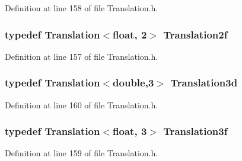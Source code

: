 Definition at line 158 of file Translation.\-h.

\hypertarget{group___geometry___module_ga94a8401d6caf6c9688fd14a17297fa20}{
\subsubsection[{Translation2f}]{\setlength{\rightskip}{0pt plus 5cm}typedef {\bf Translation}$<${\bf float}, 2$>$ {\bf Translation2f}}}\label{group___geometry___module_ga94a8401d6caf6c9688fd14a17297fa20}


Definition at line 157 of file Translation.\-h.

\hypertarget{group___geometry___module_gac7244ecac036525fb23aad8d3bf3209f}{
\subsubsection[{Translation3d}]{\setlength{\rightskip}{0pt plus 5cm}typedef {\bf Translation}$<${\bf double},3$>$ {\bf Translation3d}}}\label{group___geometry___module_gac7244ecac036525fb23aad8d3bf3209f}


Definition at line 160 of file Translation.\-h.

\hypertarget{group___geometry___module_ga53a248891c9ce7fb37ed793cd85eed85}{
\subsubsection[{Translation3f}]{\setlength{\rightskip}{0pt plus 5cm}typedef {\bf Translation}$<${\bf float}, 3$>$ {\bf Translation3f}}}\label{group___geometry___module_ga53a248891c9ce7fb37ed793cd85eed85}


Definition at line 159 of file Translation.\-h.



